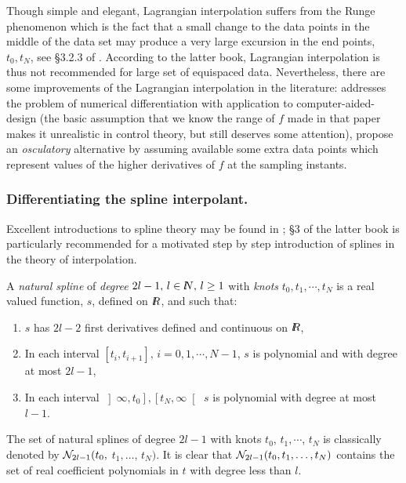 Though simple and elegant, Lagrangian interpolation suffers from the
{\rm Runge phenomenon} which is the fact that a small change to the data
points in the middle of the data set may produce a very large excursion in
the end points, $t_0, t_N$, see \S 3.2.3 of \cite{nonweiler1984}.
According to the latter book,
Lagrangian interpolation is thus not recommended for large set of equispaced
data.
Nevertheless, there are some improvements of the Lagrangian interpolation in
the literature: \cite{schaback1992} addresses the problem of numerical
differentiation with application to computer-aided-design (the basic
assumption that we know the range of $f$ made in that paper makes it
unrealistic in control theory, but still deserves some attention),
\cite{criscuolo1990,criscuolo1991,criscuolo1992a,criscuolo1992b} propose an
{\it osculatory} alternative by assuming available some extra data points
which represent values of the higher derivatives of $f$ at the sampling
instants.

\subsubsection{Differentiating the spline interpolant.}

Excellent introductions to spline theory may be found in
\cite{greville1969b,nonweiler1984}; \S 3 of the latter book is particularly
recommended for a motivated step by step introduction of splines in the
theory of interpolation.

A {\it natural spline} of {\it degree} $2l-1, \, l \in \hbox{$l\! \! N$}, \, l \ge 1$
with {\it knots} $t_0, t_1, \cdots, t_N$ is a real valued function, $s$,
defined on $\hbox{$l\! \! R$}$, and such that:
\begin{enumerate}
\def\theenumi{\roman{enumi}}
\def\labelenumi{(\theenumi)}
\item $s$ has $2l-2$ first derivatives defined and continuous on
$\hbox{$l\! \! R$}$,
\item In each interval $\left[ t_i,t_{i+1} \right], \, i = 0, 1,
\cdots, N-1$, $s$ is polynomial and with degree at most $2l-1$,
\item In each interval $\left] \infty,t_0 \right], \left[t_N,\infty
\right[$ $s$ is polynomial with degree at most $l-1$.
\end{enumerate}

The set of natural splines of degree $2l -1$ with knots $t_0$, $t_1,
\cdots$, $t_N$ is classically denoted by ${\cal N}_{2l-1}(t_0,$ $t_1, \ldots$,
$t_N)$.
It is clear that ${\cal N}_{2l-1}(t_0, t_1, \ldots, t_N)$ contains the set
of real coefficient polynomials in $t$ with degree less than $l$.

